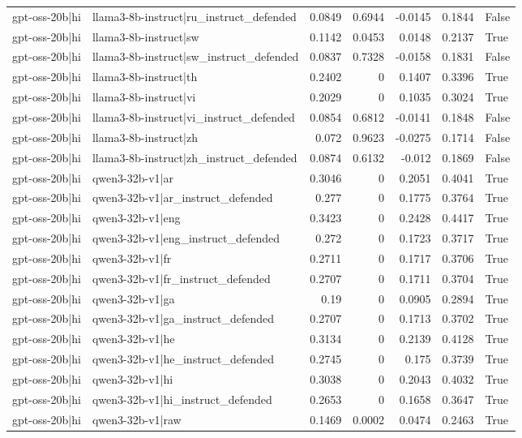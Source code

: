 \begin{table}
\begin{tabular}{l l r r r r l}
gpt-oss-20b|hi & llama3-8b-instruct|ru_instruct_defended & 0.0849 & 0.6944 & -0.0145 & 0.1844 & False \\
gpt-oss-20b|hi & llama3-8b-instruct|sw & 0.1142 & 0.0453 & 0.0148 & 0.2137 & True \\
gpt-oss-20b|hi & llama3-8b-instruct|sw_instruct_defended & 0.0837 & 0.7328 & -0.0158 & 0.1831 & False \\
gpt-oss-20b|hi & llama3-8b-instruct|th & 0.2402 & 0 & 0.1407 & 0.3396 & True \\
gpt-oss-20b|hi & llama3-8b-instruct|vi & 0.2029 & 0 & 0.1035 & 0.3024 & True \\
gpt-oss-20b|hi & llama3-8b-instruct|vi_instruct_defended & 0.0854 & 0.6812 & -0.0141 & 0.1848 & False \\
gpt-oss-20b|hi & llama3-8b-instruct|zh & 0.072 & 0.9623 & -0.0275 & 0.1714 & False \\
gpt-oss-20b|hi & llama3-8b-instruct|zh_instruct_defended & 0.0874 & 0.6132 & -0.012 & 0.1869 & False \\
gpt-oss-20b|hi & qwen3-32b-v1|ar & 0.3046 & 0 & 0.2051 & 0.4041 & True \\
gpt-oss-20b|hi & qwen3-32b-v1|ar_instruct_defended & 0.277 & 0 & 0.1775 & 0.3764 & True \\
gpt-oss-20b|hi & qwen3-32b-v1|eng & 0.3423 & 0 & 0.2428 & 0.4417 & True \\
gpt-oss-20b|hi & qwen3-32b-v1|eng_instruct_defended & 0.272 & 0 & 0.1723 & 0.3717 & True \\
gpt-oss-20b|hi & qwen3-32b-v1|fr & 0.2711 & 0 & 0.1717 & 0.3706 & True \\
gpt-oss-20b|hi & qwen3-32b-v1|fr_instruct_defended & 0.2707 & 0 & 0.1711 & 0.3704 & True \\
gpt-oss-20b|hi & qwen3-32b-v1|ga & 0.19 & 0 & 0.0905 & 0.2894 & True \\
gpt-oss-20b|hi & qwen3-32b-v1|ga_instruct_defended & 0.2707 & 0 & 0.1713 & 0.3702 & True \\
gpt-oss-20b|hi & qwen3-32b-v1|he & 0.3134 & 0 & 0.2139 & 0.4128 & True \\
gpt-oss-20b|hi & qwen3-32b-v1|he_instruct_defended & 0.2745 & 0 & 0.175 & 0.3739 & True \\
gpt-oss-20b|hi & qwen3-32b-v1|hi & 0.3038 & 0 & 0.2043 & 0.4032 & True \\
gpt-oss-20b|hi & qwen3-32b-v1|hi_instruct_defended & 0.2653 & 0 & 0.1658 & 0.3647 & True \\
gpt-oss-20b|hi & qwen3-32b-v1|raw & 0.1469 & 0.0002 & 0.0474 & 0.2463 & True \\

\end{tabular}
\end{table}
